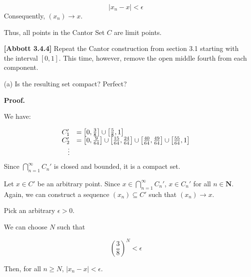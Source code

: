 \documentclass[10pt]{article}
\begin{document}
\begin{equation*}
|x_{n} -x|< \epsilon 
\end{equation*}
Consequently, $\displaystyle ( x_{n})\rightarrow x$. 



Thus, all points in the Cantor Set $\displaystyle C$ are limit points.



\textbf{[Abbott 3.4.4]} Repeat the Cantor construction from section 3.1 starting with the interval $\displaystyle [ 0,1]$. This time, however, remove the open middle fourth from each component.



(a) Is the resulting set compact? Perfect?



\textbf{Proof.}



We have:


\begin{equation*}
\begin{array}{ r l }
C_{1} ' & =\left[ 0,\frac{3}{8}\right] \cup \left[\frac{5}{8} ,1\right]\\
C_{2} ' & =\left[ 0,\frac{9}{64}\right] \cup \left[\frac{15}{64} ,\frac{24}{64}\right] \cup \left[\frac{40}{64} ,\frac{49}{64}\right] \cup \left[\frac{55}{64} ,1\right]\\
\vdots  & 
\end{array}
\end{equation*}
Since $\displaystyle \bigcap _{n=1}^{\infty } C_{n} '$ is closed and bounded, it is a compact set. 



Let $\displaystyle x\in C'$ be an arbitrary point. Since $\displaystyle x\in \bigcap _{n=1}^{\infty } C_{n} '$, $\displaystyle x\in C_{n} '$ for all $\displaystyle n\in \mathbf{N}$. Again, we can construct a sequence $\displaystyle ( x_{n}) \subseteq C'$ such that $\displaystyle ( x_{n})\rightarrow x$. 



Pick an arbitrary $\displaystyle \epsilon  >0$.



We can choose $\displaystyle N$ such that 


\begin{equation*}
\left(\frac{3}{8}\right)^{N} < \epsilon 
\end{equation*}


Then, for all $\displaystyle n\geq N$, $\displaystyle |x_{n} -x|< \epsilon $. 
\end{document}
